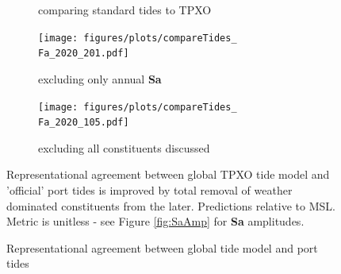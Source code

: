 \begin{figure}[H]
\begin{subfigure}[b]{\figwidthThird}
        \caption{\Fname{} comparing standard tides to TPXO}
    \end{subfigure}
    \hfill{}
    \begin{subfigure}[b]{\figwidthThird}
        \texttt{[image: figures/plots/compareTides\_\\Fa\_2020\_201.pdf]} 
        \caption{\Fname{} excluding only annual \textbf{Sa}}
    \end{subfigure}
    \hfill{}
    \begin{subfigure}[b]{\figwidthThird}
        \texttt{[image: figures/plots/compareTides\_\\Fa\_2020\_105.pdf]} 
        \caption{\Fname{} excluding all constituents discussed}
    \end{subfigure}
    
    \caption{Representational agreement between global tide model and port tides}
    {Representational agreement between global TPXO tide model and 'official' port tides is improved by total removal of weather dominated constituents from the later.   Predictions relative to MSL.  Metric is unitless - see Figure \ref{fig:SaAmp} for \textbf{Sa} amplitudes.}
    \label{fig:improveOtps}
\end{figure}   


